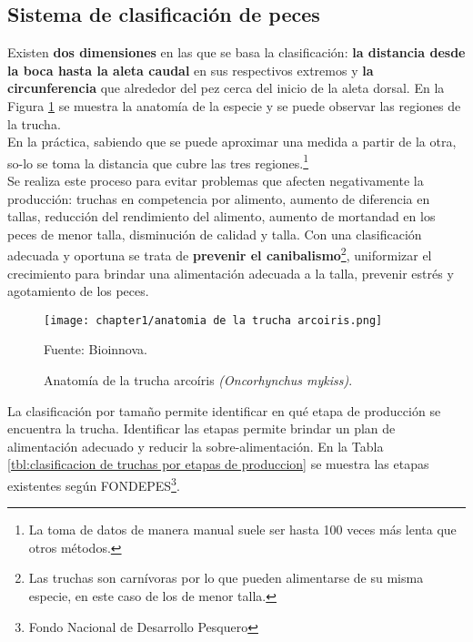 \subsection{Sistema de clasificación de peces}
Existen \textbf{dos dimensiones} en las que se basa la clasificación: \textbf{la distancia desde la boca hasta la aleta caudal} en sus respectivos extremos y \textbf{la circunferencia} que alrededor del pez cerca del inicio de la aleta dorsal. En la Figura \ref{fig:anatomia de la trucha arcoiris} se muestra la anatomía de la especie y se puede observar las regiones de la trucha. \\

En la práctica, sabiendo que se puede aproximar una medida a partir de la otra, so-lo se toma la distancia que cubre las tres regiones.\footnote{La toma de datos de manera manual suele ser hasta 100 veces más lenta que otros métodos.} \\

Se realiza este proceso para evitar problemas que afecten negativamente la producción: truchas en competencia por alimento, aumento de diferencia en tallas, reducción del rendimiento del alimento, aumento de mortandad en los peces de menor talla, disminución de calidad y talla. Con una clasificación adecuada y oportuna se trata de \textbf{prevenir el canibalismo}\footnote{Las truchas son carnívoras por lo que pueden alimentarse de su misma especie, en este caso de los de menor talla.}, uniformizar el crecimiento para brindar una alimentación adecuada a la talla, prevenir estrés y agotamiento de los peces.\cite[p.~16]{Flores2010} \\

\begin{figure}[H]
	\centering
	\texttt{[image: chapter1/anatomia de la trucha arcoiris.png]}
	\caption{Anatomía de la trucha arcoíris \textit{(Oncorhynchus mykiss)}.}
	Fuente: Bioinnova.
	\label{fig:anatomia de la trucha arcoiris}
\end{figure}


La clasificación por tamaño permite identificar en qué etapa de producción se encuentra la trucha. Identificar las etapas permite brindar un plan de alimentación adecuado y reducir la sobre-alimentación. En la Tabla \ref{tbl:clasificacion de truchas por etapas de produccion} se muestra las etapas existentes según FONDEPES\footnote{Fondo Nacional de Desarrollo Pesquero}.


